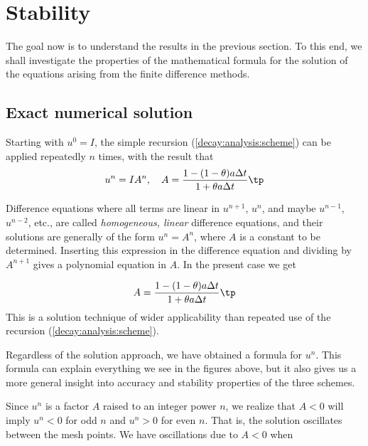 \documentclass[graybox,sectrefs,envcountresetchap,open=right,final]{svmonodo}
\newenvironment{notice_mdfboxadmon}[1][]{
\begin{notice_mdfboxmdframed}[frametitle=#1]
}
{
\end{notice_mdfboxmdframed}
}
\begin{document}
\section{Stability}

The goal now is to understand the results in the previous section.
To this end, we shall investigate the properties of the mathematical
formula for the solution of the equations arising from the finite
difference methods.

\subsection{Exact numerical solution}

Starting with $u^0=I$, the simple recursion (\ref{decay:analysis:scheme})
can be applied repeatedly $n$ times, with the result that
\begin{equation}
u^{n} = IA^n,\quad A = \frac{1 - (1-\theta) a\Delta t}{1 + \theta a\Delta t}\tp
\label{decay:analysis:unex}
\end{equation}


\begin{notice_mdfboxadmon}
Difference equations where all terms are linear in
$u^{n+1}$, $u^n$, and maybe $u^{n-1}$, $u^{n-2}$, etc., are
called \emph{homogeneous, linear} difference equations, and their solutions
are generally of the form $u^n=A^n$, where $A$ is a constant to be
determined. Inserting this expression in the difference equation
and dividing by $A^{n+1}$ gives
a polynomial equation in $A$. In the present case we get

\[ A = \frac{1 - (1-\theta) a\Delta t}{1 + \theta a\Delta t}\tp \]
This is a solution technique of wider applicability than repeated use of
the recursion (\ref{decay:analysis:scheme}).
\end{notice_mdfboxadmon}



Regardless of the solution approach, we have obtained a formula for
$u^n$.  This formula can explain everything we see in the figures
above, but it also gives us a more general insight into accuracy and
stability properties of the three schemes.


Since $u^n$ is a factor $A$
raised to an integer power $n$, we realize that $A < 0$
will imply $u^n < 0$ for odd $n$ and $u^n > 0$ for even $n$.
That is, the solution oscillates between the mesh points.
We have oscillations due to $A < 0$ when
\end{document}
